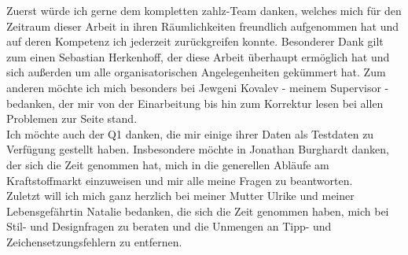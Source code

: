 \thispagestyle{empty}

Zuerst würde ich gerne dem kompletten zahlz-Team danken, welches mich für den Zeitraum dieser Arbeit in ihren Räumlichkeiten freundlich aufgenommen hat und auf deren Kompetenz ich jederzeit zurückgreifen konnte. Besonderer Dank gilt zum einen Sebastian Herkenhoff, der diese Arbeit überhaupt ermöglich hat und sich außerden um alle organisatorischen Angelegenheiten gekümmert hat. Zum anderen möchte ich mich besonders bei Jewgeni Kovalev - meinem Supervisor - bedanken, der mir von der Einarbeitung bis hin zum Korrektur lesen bei allen Problemen zur Seite stand.\\
Ich möchte auch der Q1 danken, die mir einige ihrer Daten als Testdaten zu Verfügung gestellt haben. Insbesondere möchte in Jonathan Burghardt danken, der sich die Zeit genommen hat, mich in die generellen Abläufe am Kraftstoffmarkt einzuweisen und mir alle meine Fragen zu beantworten.\\
Zuletzt will ich mich ganz herzlich bei meiner Mutter Ulrike und meiner Lebensgefährtin Natalie bedanken, die sich die Zeit genommen haben, mich bei Stil- und Designfragen zu beraten und die Unmengen an Tipp- und Zeichensetzungsfehlern zu entfernen.

\clearpage

